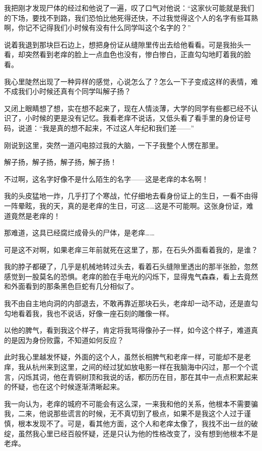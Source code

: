 我把刚才发现尸体的经过和他说了一遍，叹了口气对他说：“这家伙可能就是我们的下场，要找不到路，我们恐怕比他死得还快，不过我觉得这个人的名字有些耳熟啊，你记不记得我们小时候有没有什么同学叫这个名字的？”

说着我退到那块巨石边上，想把身份证从缝隙里传出去给他看看。可是我抬头一看，却突然看到老痒的脸上一点血色也没有，惨白惨白，正直勾勾地盯着我的脸看。

我心里陡然出现了一种异样的感觉，心说怎么了？怎么一下子变成这样的表情，难不成我们小时候还真有个同学叫解子扬？

又闭上眼睛想了想，实在想不起来了，现在人情淡薄，大学的同学有些都已经不认识了，小时候的更是没有记忆。我看老痒不说话，又低头看了看手里的身份证号码，说道：“我是真的想不起来，不过这人年纪和我们差——”

刚说到这里，突然一道闪电掠过我的大脑，一下子我整个人愣在那里。

解子扬，解子扬，解子扬，解子扬！

不过啊，这名字好像不是什么陌生的名字——这是老痒的本名啊！

我的头皮猛地一炸，几乎打了个寒战，忙仔细地去看身份证上的生日，一看不由得一阵晕眩，我的天，真的是老痒的生日，可这……这是不可能啊。这张身份证，难道竟然是老痒的！

那难道，这具已经腐烂成骨头的尸体，是老痒……

可是这不对啊，如果老痒三年前就死在这里了，那，在石头外面看着我的，是谁？

我的脖子都硬了，几乎是机械地转过头去，看着石头缝隙里透出的那半张脸，忽然感觉到一股莫名的恐惧。老痒的脸在手电光的闪烁下，显得鬼气森森，看上去竟然和外面看到的那条黑色巨蛇有几分相似了。

我不由自主地向洞的内部退去，不敢再靠近那块石头，老痒却一动不动，还是直勾勾地看着我，我也不说话，好像一座石刻的雕像一样。

以他的脾气，看到我这个样子，肯定将我骂得像孙子一样，如今这个样子，难道真的是因为身份败露，不知道如何反应？

此时我心里越发怀疑，外面的这个人，虽然长相脾气和老痒一样，可能却不是老痒，我从杭州来到这里，之间的经过犹如放电影一样在我脑海中闪过，那一个个谎言，闪烁其词，他在青铜树顶和我说的话，都历历在目，那在其中一点点积累起来的怀疑，也在这个时候逐渐清晰起来。

我一向认为，老痒的城府不可能会有这么深，一来我和他的关系，他根本不需要骗我，二来，他说那些谎言的时候，无不真切到了极点，如果不是我这个人过于谨慎，根本发现不了。可是，看其他方面，这个人和老痒太像了，我找不出一丝的破绽，虽然我心里已经百般怀疑，还是只认为他的性格改变了，没有想到他根本不是老痒。


